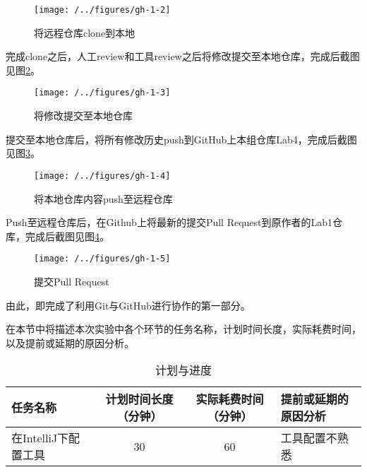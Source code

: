 \begin{figure}
\centering
\texttt{[image: /../figures/gh-1-2]}
\caption{将远程仓库clone到本地}
\label{fig:gh-1-2}
\end{figure}

完成clone之后，人工review和工具review之后将修改提交至本地仓库，完成后截图见图\ref{fig:gh-1-3}。

\begin{figure}
\centering
\texttt{[image: /../figures/gh-1-3]}
\caption{将修改提交至本地仓库}
\label{fig:gh-1-3}
\end{figure}

提交至本地仓库后，将所有修改历史push到GitHub上本组仓库Lab4，完成后截图见图\ref{fig:gh-1-4}。

\begin{figure}
\centering
\texttt{[image: /../figures/gh-1-4]}
\caption{将本地仓库内容push至远程仓库}
\label{fig:gh-1-4}
\end{figure}

Push至远程仓库后，在Github上将最新的提交Pull Request到原作者的Lab1仓库，完成后截图见图\ref{fig:gh-1-5}。

\begin{figure}
\centering
\texttt{[image: /../figures/gh-1-5]}
\caption{提交Pull Request}
\label{fig:gh-1-5}
\end{figure}

由此，即完成了利用Git与GitHub进行协作的第一部分。


在本节中将描述本次实验中各个环节的任务名称，计划时间长度，实际耗费时间，以及提前或延期的原因分析。
\begin{table}
\caption{计划与进度}\label{tab:plan}
\begin{tabularx}{\linewidth}{|X|c|c|X|}
\hline
任务名称 & 计划时间长度（分钟） & 实际耗费时间（分钟） & 提前或延期的原因分析\\
\hline
\endhead
在IntelliJ下配置工具 & 30 & 60 & 工具配置不熟悉\\
\hline
\end{tabularx}
\end{table}



